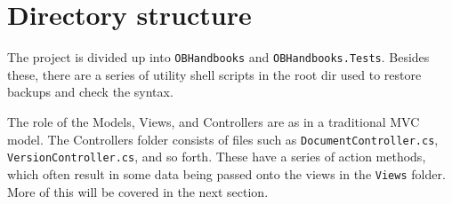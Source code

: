 \section{Directory structure}
The project is divided up into \texttt{OBHandbooks} and \texttt{OBHandbooks.Tests}.
Besides these, there are a series of utility shell scripts in the root dir used to restore backups and check the syntax.

The role of the Models, Views, and Controllers are as in a traditional MVC model.
The Controllers folder consists of files such as \texttt{DocumentController.cs}, \texttt{VersionController.cs}, and so forth.
These have a series of action methods, which often result in some data being passed onto the views in the \texttt{Views} folder.
More of this will be covered in the next section.
